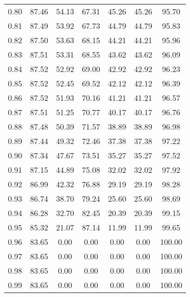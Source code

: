 \begin{tabular}{|c|c|c|c|c|c|c|}
      0.80 &     87.46 &     54.13 &      67.31 &   45.26 &      45.26 &         95.70 \\
      0.81 &     87.49 &     53.92 &      67.73 &   44.79 &      44.79 &         95.83 \\
      0.82 &     87.50 &     53.63 &      68.15 &   44.21 &      44.21 &         95.96 \\
      0.83 &     87.51 &     53.31 &      68.55 &   43.62 &      43.62 &         96.09 \\
      0.84 &     87.52 &     52.92 &      69.00 &   42.92 &      42.92 &         96.23 \\
      0.85 &     87.52 &     52.45 &      69.52 &   42.12 &      42.12 &         96.39 \\
      0.86 &     87.52 &     51.93 &      70.16 &   41.21 &      41.21 &         96.57 \\
      0.87 &     87.51 &     51.25 &      70.77 &   40.17 &      40.17 &         96.76 \\
      0.88 &     87.48 &     50.39 &      71.57 &   38.89 &      38.89 &         96.98 \\
      0.89 &     87.44 &     49.32 &      72.46 &   37.38 &      37.38 &         97.22 \\
      0.90 &     87.34 &     47.67 &      73.51 &   35.27 &      35.27 &         97.52 \\
      0.91 &     87.15 &     44.89 &      75.08 &   32.02 &      32.02 &         97.92 \\
      0.92 &     86.99 &     42.32 &      76.88 &   29.19 &      29.19 &         98.28 \\
      0.93 &     86.74 &     38.70 &      79.24 &   25.60 &      25.60 &         98.69 \\
      0.94 &     86.28 &     32.70 &      82.45 &   20.39 &      20.39 &         99.15 \\
      0.95 &     85.32 &     21.07 &      87.14 &   11.99 &      11.99 &         99.65 \\
      0.96 &     83.65 &      0.00 &       0.00 &    0.00 &       0.00 &        100.00 \\
      0.97 &     83.65 &      0.00 &       0.00 &    0.00 &       0.00 &        100.00 \\
      0.98 &     83.65 &      0.00 &       0.00 &    0.00 &       0.00 &        100.00 \\
      0.99 &     83.65 &      0.00 &       0.00 &    0.00 &       0.00 &        100.00 \\
\bottomrule
\end{tabular}
